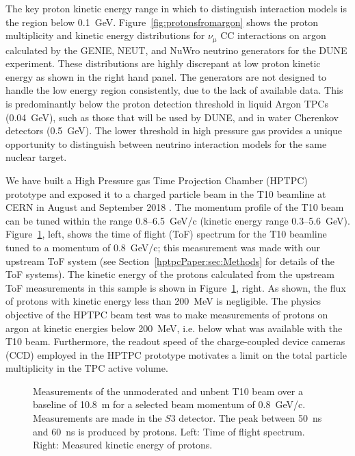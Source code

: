 The key proton kinetic energy range in which to distinguish interaction models is the region below 0.1~GeV.
Figure~\ref{fig:protonsfromargon} shows the proton multiplicity and kinetic energy distributions for $\nu_{\mu}$ CC interactions on argon calculated by the GENIE, NEUT, and NuWro neutrino generators for the DUNE experiment.
These distributions are highly discrepant at low proton kinetic energy as shown in the right hand panel. The generators are not designed to handle the low energy region consistently, due to the lack of available data.
This is predominantly below the proton detection threshold in liquid Argon TPCs (0.04~GeV), such as those that will be used by DUNE, and in water Cherenkov detectors (0.5~GeV).
The lower threshold in high pressure gas provides a unique opportunity to distinguish between neutrino interaction models for the same nuclear target.

We have built a High Pressure gas Time Projection Chamber (HPTPC) prototype and exposed it to a charged particle beam in the T10 beamline at CERN in August and September 2018 \cite{SPSC-P-355}.
The momentum profile of the T10 beam can be tuned within the range 0.8--6.5~GeV/c (kinetic energy range 0.3--5.6~GeV). 
Figure~\ref{fig:utofNoBend}, left, shows the time of flight (ToF) spectrum for the T10 beamline tuned to a momentum of 0.8~GeV/c; this measurement was made with our upstream ToF system (see Section~\ref{hptpcPaper:sec:Methods} for details of the ToF systems).
The kinetic energy of the protons calculated from the upstream ToF measurements in this sample is shown in Figure~\ref{fig:utofNoBend}, right.
As shown, the flux of protons with kinetic energy less than 200~MeV is negligible.
The physics objective of the HPTPC beam test was to make measurements of protons on argon at kinetic energies below 200~MeV, i.e. below what was available with the T10 beam. 
Furthermore, the readout speed of the charge-coupled device cameras (CCD) employed in the HPTPC prototype motivates a limit on the total particle multiplicity in the TPC active volume.

\begin{figure}
  \begin{minipage}[t]{0.49\textwidth}
    \centering
    \begin{adjustbox}{max totalsize={\textwidth},center}
      
    \end{adjustbox}
  \end{minipage}
  \hfill
  \begin{minipage}[t]{0.49\textwidth}
    \centering
    \begin{adjustbox}{max totalsize={\textwidth},center}
      
    \end{adjustbox}
  \end{minipage}
  \caption{\label{fig:utofNoBend}Measurements of the unmoderated and unbent T10 beam over a baseline of 10.8~m for a selected beam momentum of 0.8~GeV/c. Measurements are made in the $\mathit{S3}$ detector. The peak between 50~ns and 60~ns is produced by protons. Left: Time of flight spectrum. Right: Measured kinetic energy of protons.}
\end{figure}

